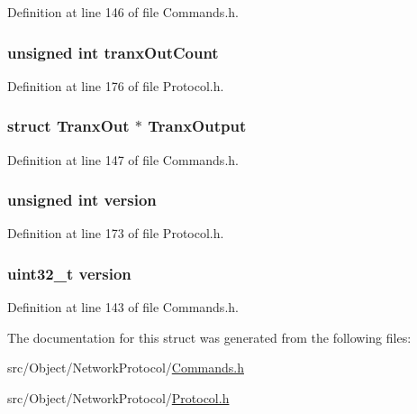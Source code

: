 Definition at line 146 of file Commands.h.

\hypertarget{struct_cmd_tranx_a6508946c345b4ea761a9d66c38a5fe7a}{
\subsubsection[{tranxOutCount}]{\setlength{\rightskip}{0pt plus 5cm}unsigned int {\bf tranxOutCount}}}
\label{struct_cmd_tranx_a6508946c345b4ea761a9d66c38a5fe7a}


Definition at line 176 of file Protocol.h.

\hypertarget{struct_cmd_tranx_afd763f710fae1f1cefe4c6260c1a5568}{
\subsubsection[{TranxOutput}]{\setlength{\rightskip}{0pt plus 5cm}struct {\bf TranxOut} $\ast$ {\bf TranxOutput}}}
\label{struct_cmd_tranx_afd763f710fae1f1cefe4c6260c1a5568}


Definition at line 147 of file Commands.h.

\hypertarget{struct_cmd_tranx_a5408ac5df4c170828874e1b10b4c35a0}{
\subsubsection[{version}]{\setlength{\rightskip}{0pt plus 5cm}unsigned int {\bf version}}}
\label{struct_cmd_tranx_a5408ac5df4c170828874e1b10b4c35a0}


Definition at line 173 of file Protocol.h.

\hypertarget{struct_cmd_tranx_acd99bb05ca015e7d74448acb1deba7ca}{
\subsubsection[{version}]{\setlength{\rightskip}{0pt plus 5cm}uint32\_\-t {\bf version}}}
\label{struct_cmd_tranx_acd99bb05ca015e7d74448acb1deba7ca}


Definition at line 143 of file Commands.h.



The documentation for this struct was generated from the following files:\begin{DoxyCompactItemize}
\item 
src/Object/NetworkProtocol/\hyperlink{_commands_8h}{Commands.h}\item 
src/Object/NetworkProtocol/\hyperlink{_protocol_8h}{Protocol.h}\end{DoxyCompactItemize}

